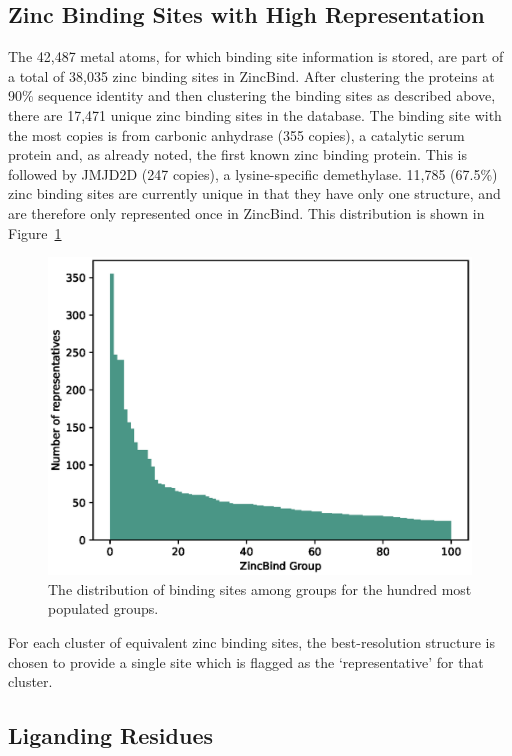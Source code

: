 \subsection{Zinc Binding Sites with High Representation}

The 42,487 metal atoms, for which binding site information is stored, are part of a total of 38,035 zinc binding sites in ZincBind. After clustering the proteins at 90\% sequence identity and then clustering the binding sites as described above, there are 17,471 unique zinc binding sites in the database. The binding site with the most copies is from carbonic anhydrase (355 copies), a catalytic serum protein and, as already noted, the first known zinc binding protein. This is followed by JMJD2D (247 copies), a lysine-specific demethylase. 11,785 (67.5\%) zinc binding sites are currently unique in that they have only one structure, and are therefore only represented once in ZincBind. This distribution is shown in Figure~\ref{fig:group-clusters}

\begin{figure}
\centering
\includegraphics[width=1.0\textwidth]{Figures/group-clusters.eps}
\caption{\label{fig:group-clusters} The distribution of binding sites among groups for the hundred most populated groups.}
\end{figure}

For each cluster of equivalent zinc binding sites, the best-resolution structure is chosen to provide a single site which is flagged as the `representative' for that cluster.

\subsection{Liganding Residues}

